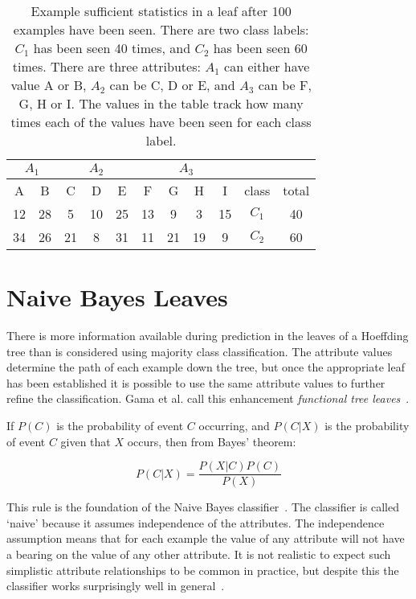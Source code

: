 \begin{table}
\caption{Example sufficient statistics in a leaf after 100 examples have been seen. There are two class labels: $C_{1}$ has been seen 40 times, and $C_{2}$ has been seen 60 times. There are three attributes: $A_{1}$ can either have value A or B, $A_{2}$ can be C, D or E, and $A_{3}$ can be F, G, H or I. The values in the table track how many times each of the values have been seen for each class label.}
\label{tab:leafsuffstats}
\centering
\begin{tabular}{|c|c||c|c|c||c|c|c|c||c|c|}
\hline
\multicolumn{2}{|c||}{$A_{1}$} & \multicolumn{3}{|c||}{$A_{2}$} & \multicolumn{4}{|c||}{$A_{3}$} & & \\
\hline
A & B & C & D & E & F & G & H & I & class & total \\
\hline
12 & 28 & 5 & 10 & 25 & 13 & 9 & 3 & 15 & $C_{1}$ & 40 \\
34 & 26 & 21 & 8 & 31 & 11 & 21 & 19 & 9 & $C_{2}$ & 60 \\
\hline
\end{tabular}
\end{table}

\section{Naive Bayes Leaves}
\label{sec:nbleaf}

There is more information available during prediction in the leaves of a Hoeffding tree than is considered using majority class classification. The attribute values determine the path of each example down the tree, but once the appropriate leaf has been established it is possible to use the same attribute values to further refine the classification. Gama et al. call this enhancement {\em functional tree leaves}~\cite{ufft,vfdtc}.

If $P(C)$ is the probability of event $C$ occurring, and $P(C|X)$ is the probability of event $C$ given that $X$ occurs, then from Bayes' theorem:

\begin{equation} \label{eq:bayes}
P(C|X) = \frac{P(X|C) P(C)}{P(X)}
\end{equation}

This rule is the foundation of the Naive Bayes classifier~\cite{naivebayes}. The classifier is called `naive' because it assumes independence of the attributes. The independence assumption means that for each example the value of any attribute will not have a bearing on the value of any other attribute. It is not realistic to expect such simplistic attribute relationships to be common in practice, but despite this the classifier works surprisingly well in general~\cite{nboptimal,nbdiagnose}.

